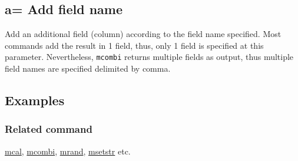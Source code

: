 %

\subsection{a= Add field name\label{sect:option_a}}

Add an additional field (column) according to the field name specified.
Most commands add the result in 1 field, thus, only 1 field is specified at this parameter.  Nevertheless, \verb|mcombi| returns multiple fields as output, thus multiple field names are specified delimited by comma.

\subsection*{Examples}


\subsubsection*{Related command}
\hyperref[sect:mcal]{mcal},
\hyperref[sect:mcombi]{mcombi},
\hyperref[sect:mrand]{mrand},
\hyperref[sect:msetstr]{msetstr} etc.

%

